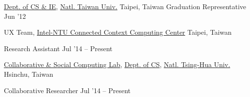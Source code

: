 \documentclass[10pt, a4paper]{article} %
\begin{document}
\spacedhrule{0.5em}{-1em} %




\headedsection %
{\href{http://www.csie.ntu.edu.tw}{Dept. of CS \& IE}, \href{http://www.ntu.edu.tw}{Natl. Taiwan Univ.}}
{Taipei, Taiwan}
{\headedsubsection %
	{Graduation Representative}
	{Jun '12} 
	{}
}

\spacedhrule{1.5em}{-1em} %





\headedsection
{UX Team, \href{http://ccc.ntu.edu.tw/}{Intel-NTU Connected Context Computing Center}}
{Taipei, Taiwan}{

	\headedsubsection
	{Research Assistant}
	{Jul '14 -- Present}
	{}
}


\headedsection
{\href{http://csclab.tw/}{Collaborative \& Social Computing Lab},
 \href{http://www.cs.nthu.edu.tw}{Dept. of CS},
 \href{http://www.nthu.edu.tw}{Natl. Tsing-Hua Univ.}}
{Hsinchu, Taiwan}{

	\headedsubsection
	{Collaborative Researcher}
	{Jul '14 -- Present}
	{}
}
\end{document}
